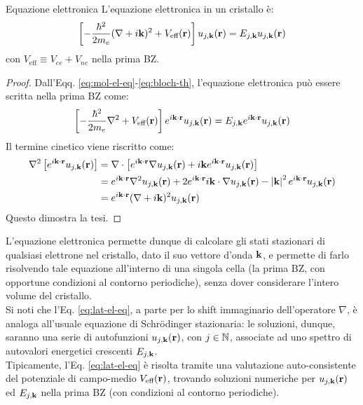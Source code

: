 \begin{proposition}{Equazione elettronica}{}
	L'equazione elettronica in un cristallo è:
	\begin{equation}
		\left[ -\frac{\hbar^2}{2m_e} (\nabla + i\mathbf{k})^2 + V_\text{eff}(\mathbf{r}) \right] u_{j,\mathbf{k}}(\mathbf{r}) = E_{j,\mathbf{k}} u_{j,\mathbf{k}}(\mathbf{r})
		\label{eq:lat-el-eq}
	\end{equation}
	con $ V_\text{eff} \equiv V_{ee} + V_{ne} $ nella prima BZ.

	\tcblower

	\begin{proof}
		Dall'Eqq. \ref{eq:mol-el-eq}-\ref{eq:bloch-th}, l'equazione elettronica può essere scritta nella prima BZ come:
		\begin{equation*}
			\left[ -\frac{\hbar^2}{2m_e} \nabla^2 + V_\text{eff}(\mathbf{r}) \right] e^{i \mathbf{k} \cdot \mathbf{r}} u_{j,\mathbf{k}}(\mathbf{r}) = E_{j,\mathbf{k}} e^{i \mathbf{k} \cdot \mathbf{r}} u_{j,\mathbf{k}}(\mathbf{r})
		\end{equation*}
		Il termine cinetico viene riscritto come:
		\begin{equation*}
			\begin{split}
				\nabla^2 \left[ e^{i \mathbf{k} \cdot \mathbf{r}} u_{j,\mathbf{k}}(\mathbf{r}) \right]
				& = \nabla \cdot \left[ e^{i \mathbf{k} \cdot \mathbf{r}} \nabla u_{j,\mathbf{k}}(\mathbf{r}) + i \mathbf{k} e^{i \mathbf{k} \cdot \mathbf{r}} u_{j,\mathbf{k}}(\mathbf{r}) \right] \\
				& = e^{i \mathbf{k} \cdot \mathbf{r}} \nabla^2 u_{j,\mathbf{k}}(\mathbf{r}) + 2 e^{i \mathbf{k} \cdot \mathbf{r}} i \mathbf{k} \cdot \nabla u_{j,\mathbf{k}}(\mathbf{r}) - \left\lvert\mathbf{k}\right\rvert^2 e^{i \mathbf{k} \cdot \mathbf{r}} u_{j,\mathbf{k}}(\mathbf{r}) \\
				& = e^{i \mathbf{k} \cdot \mathbf{r}} (\nabla + i \mathbf{k})^2 u_{j,\mathbf{k}}(\mathbf{r})
			\end{split}
		\end{equation*}
		Questo dimostra la tesi.
	\end{proof}
\end{proposition}

L'equazione elettronica permette dunque di calcolare gli stati stazionari di qualsiasi elettrone nel cristallo, dato il suo vettore d'onda $ \mathbf{k} $, e permette di farlo risolvendo tale equazione all'interno di una singola cella (la prima BZ, con opportune condizioni al contorno periodiche), senza dover considerare l'intero volume del cristallo. \\
Si noti che l'Eq. \ref{eq:lat-el-eq}, a parte per lo shift immaginario dell'operatore $ \nabla $, è analoga all'usuale equazione di Schrödinger stazionaria: le soluzioni, dunque, saranno una serie di autofunzioni $ u_{j,\mathbf{k}}(\mathbf{r}) $, con $ j \in \mathbb{N} $, associate ad uno spettro di autovalori energetici crescenti $ E_{j,\mathbf{k}} $. \\
Tipicamente, l'Eq. \ref{eq:lat-el-eq} è risolta tramite una valutazione auto-consistente del potenziale di campo-medio $ V_\text{eff}(\mathbf{r}) $, trovando soluzioni numeriche per $ u_{j,\mathbf{k}}(\mathbf{r}) $ ed $ E_{j,\mathbf{k}} $ nella prima BZ (con condizioni al contorno periodiche).

